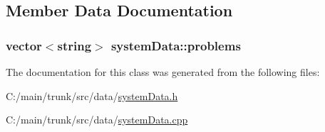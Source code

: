 \subsection{Member Data Documentation}
\hypertarget{classsystem_data_aea46d4c5b4d9b1e9177260f8691d0051}{
\subsubsection[{problems}]{\setlength{\rightskip}{0pt plus 5cm}vector$<$string$>$ {\bf systemData::problems}}}
\label{classsystem_data_aea46d4c5b4d9b1e9177260f8691d0051}


The documentation for this class was generated from the following files:\begin{DoxyCompactItemize}
\item 
C:/main/trunk/src/data/\hyperlink{system_data_8h}{systemData.h}\item 
C:/main/trunk/src/data/\hyperlink{system_data_8cpp}{systemData.cpp}\end{DoxyCompactItemize}
